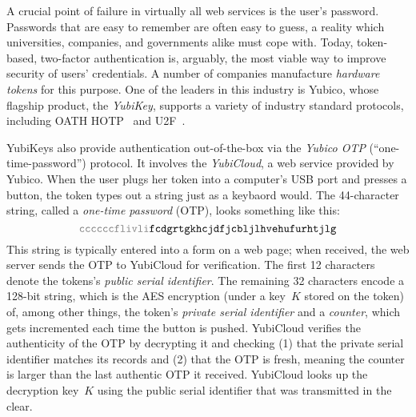 A crucial point of failure in virtually all web services is the user's
password. Passwords that are easy to remember are often easy to guess, a reality
which universities, companies, and governments alike must cope with.
%
Today, token-based, two-factor authentication is, arguably, the most viable way to improve
security of users' credentials.
%
A number of companies manufacture \emph{hardware tokens} for this purpose. One
of the leaders in this industry is Yubico, whose flagship product, the
\emph{YubiKey}, supports a variety of industry standard protocols, including
OATH HOTP~\cite{rfc4226} and U2F~\cite{u2f}.

YubiKeys also provide authentication out-of-the-box via the \emph{Yubico OTP}
(``one-time-password'') protocol. It involves the \emph{YubiCloud}, a web
service provided by Yubico. When the user plugs her token into a computer's USB
port and presses a button, the token types out a string just as a keybaord
would. The 44-character string, called a \emph{one-time password} (OTP), looks
something like this:
\[
  \texttt{\textcolor{gray}{ccccccflivli}fcdgrtgkhcjdfjcbljlhvehufurhtjlg}
\]
This string is typically entered into a form on a web page; when received, the web
server sends the OTP to YubiCloud for verification.
%
The first 12 characters denote the tokens's \emph{public serial identifier}. The
remaining 32 characters encode a 128-bit string, which is the AES encryption
(under a key~$K$ stored on the token) of, among other things, the token's
\emph{private serial identifier} and a \emph{counter}, which gets incremented
each time the button is pushed.
%
YubiCloud verifies the authenticity of the OTP by decrypting it and checking (1)
that the private serial identifier matches its records and (2) that the OTP is
fresh, meaning the counter is larger than the last authentic OTP it received.
YubiCloud looks up the decryption key~$K$ using the public serial identifier
that was transmitted in the clear.

